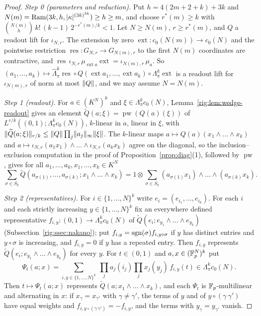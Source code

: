 \begin{proof}
\emph{Step 0 (parameters and reduction).} Put $h=4(2m+2+k)+3k$ and
$N(m)=\operatorname{Ram}(3k,h,\lvert \kappa\rvert^{(3k)^{3k}})\ge h\ge m$, and choose $r^*(m)\ge k$ with
$\binom{N(m)}h\,k!\,(k-1)\,2^{-r^*(m)/k}<1$. Let $N\ge N(m)$, $r\ge r^*(m)$, and $Q$ a readout lift for $\iota_{N,r}$.
The extension by zero $\operatorname{ext}\colon c_0(N(m))\to c_0(N)$ and the pointwise restriction
$\operatorname{res}\colon G_{N,r}\to G_{N(m),r}$ to the first $N(m)$ coordinates are contractive, and $\operatorname{res}\,\iota_{N,r}\,\mu_{\operatorname{ext}a}\operatorname{ext}=\iota_{N(m),r}\,\mu_a$. So
$(a_1,\dots,a_k)\mapsto\widehat\Lambda^k_\pi\operatorname{res}\circ Q(\operatorname{ext}a_1,\dots,\operatorname{ext}a_k)
\circ\Lambda^k_\pi\operatorname{ext}$ is a readout lift for $\iota_{N(m),r}$ of norm at most $\lVert Q\rVert$, and we may
assume $N=N(m)$.

\emph{Step 1 (readout).} For $a\in(K^N)^k$ and $\xi\in\Lambda^k_\pi c_0(N)$, Lemma~\ref{rig:lem:wedge-readout} gives an element
$\widetilde Q(a;\xi)=\operatorname{pw}(Q(a)(\xi))$ of $L^{r/k}((0,1);\Lambda^k_\pi c_0(N))$, $k$\nobreakdash-linear in $a$,
linear in $\xi$, with $\lVert \widetilde Q(a;\xi)\rVert_{r/k}\le\lVert Q\rVert\prod_j\lVert a_j\rVert_\infty\lVert \xi\rVert$. The
$k$\nobreakdash-linear maps $a\mapsto Q(a)(x_1\wedge\dots\wedge x_k)$ and
$a\mapsto\iota_{N,r}(a_1x_1)\wedge\dots\wedge\iota_{N,r}(a_kx_k)$ agree on the diagonal, so the inclusion--exclusion
computation in the proof of Proposition~\ref{prop:diag}(1), followed by $\operatorname{pw}$, gives for all
$a_1,\dots,a_k,x_1,\dots,x_k\in K^N$
\begin{equation}\label{rig:eq:pol}
 \sum_{\sigma\in S_k}\widetilde Q(a_{\sigma(1)},\dots,a_{\sigma(k)};x_1\wedge\dots\wedge x_k)
 =1\otimes\sum_{\sigma\in S_k}(a_{\sigma(1)}x_1)\wedge\dots\wedge(a_{\sigma(k)}x_k).
\end{equation}

\emph{Step 2 (representatives).} For $i\in\{1,\dots,N\}^k$ write $e_i=(e_{i_1},\dots,e_{i_k})$. For each $i$ and each
strictly increasing $y\in\{1,\dots,N\}^k$ fix an everywhere defined representative
$f_{i,y}\colon(0,1)\to\Lambda^k_\pi c_0(N)$ of $\widetilde Q(e_i;e_{y_1}\wedge\dots\wedge e_{y_k})$
(Subsection~\ref{rig:ssec:nakano}); put $f_{i,y}=\operatorname{sgn}(\sigma)f_{i,y\circ\sigma}$ if $y$ has distinct entries and
$y\circ\sigma$ is increasing, and $f_{i,y}=0$ if $y$ has a repeated entry. Then $f_{i,y}$ represents
$\widetilde Q(e_i;e_{y_1}\wedge\dots\wedge e_{y_k})$ for every $y$. For $t\in(0,1)$ and $a,x\in(\mathbb F_p^N)^k$ put
\[
 \Psi_t(a;x)=\sum_{i,y\in\{1,\dots,N\}^k}\ \prod_ja_j(i_j)\prod_jx_j(y_j)\,f_{i,y}(t)\in\Lambda^k_\pi c_0(N).
\]
Then $t\mapsto\Psi_t(a;x)$ represents $\widetilde Q(a;x_1\wedge\dots\wedge x_k)$, and each $\Psi_t$ is
$\mathbb F_p$\nobreakdash-multilinear and alternating in $x$: if $x_\gamma=x_{\gamma'}$ with $\gamma\ne\gamma'$, the terms of $y$
and of $y\circ(\gamma\ \gamma')$ have equal weights and $f_{i,y\circ(\gamma\,\gamma')}=-f_{i,y}$, and the terms with
$y_\gamma=y_{\gamma'}$ vanish.


\end{proof}

